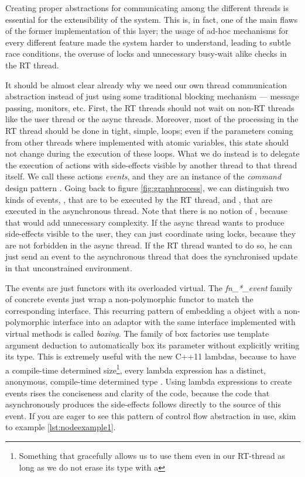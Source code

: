 Creating proper abstractions for communicating among the different
threads is essential for the extensibility of the system. This is, in
fact, one of the main flaws of the former implementation of this
layer; the usage of ad-hoc mechanisms for every different feature made
the system harder to understand, leading to subtle race conditions,
the overuse of locks and unnecessary busy-wait alike checks in the RT
thread.

It should be almost clear already why we need our own thread
communication abstraction instead of just using some traditional
blocking mechanism --- message passing, monitors, etc. First, the RT
threads should not wait on non-RT threads like the user thread or the
async threads. Moreover, most of the processing in the RT thread
should be done in tight, simple, loops; even if the parameters coming
from other threads where implemented with atomic variables, this state
should not change during the execution of these loops. What we do
instead is to delegate the execution of actions with side-effects
visible by another thread to that thread itself. We call these actions
\emph{events}, and they are an instance of the \emph{command} design
pattern \cite{gamma95design}. Going back to figure
\ref{fig:graphprocess}, we can distinguish two kinds of events,
, that are to be executed by the RT thread, and
, that are executed in the asynchronous
thread. Note that there is no notion of , because
that would add unnecessary complexity. If the async thread wants to
produce side-effects visible to the user, they can just coordinate
using locks, because they are not forbidden in the async thread. If
the RT thread wanted to do so, he can just send an event to the
asynchronous thread that does the synchronised update in that
unconstrained environment.

The events are just functors with its overloaded 
virtual. The \emph{fn\_*\_event} family of concrete events just wrap a
non-polymorphic functor to match the corresponding interface. This
recurring pattern of embedding a object with a non-polymorphic
interface into an adaptor with the same interface implemented with
virtual methods is called \emph{boxing}. The 
family of box factories use template argument deduction to
automatically box its parameter without explicitly writing its
type. This is extremely useful with the new C++11 lambdas, because to
have a compile-time determined size\footnote{Something that gracefully
  allows us to use them even in our RT-thread as long as we do not
  erase its type with a }, every lambda
expression has a distinct, anonymous, compile-time determined type
\cite{jarvi10lambda}. Using lambda expressions to create events rises
the conciseness and clarity of the code, because the code that
asynchronously produces the side-effects follows directly to the
source of this event. If you are eager to see this pattern of control
flow abstraction in use, skim to example \ref{lst:nodeexample1}.

